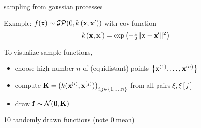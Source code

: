 \documentclass[11pt,compress,t,notes=noshow, xcolor=table]{beamer}
\begin{document}
\begin{framei}[sep=L]{sampling from gaussian processes}
\item Example: $\fx \sim \mathcal{GP}(\zero, \kxxp)$ with cov function
$$ \kxxp = \exp\left(-\tfrac{1}{2}\|\xv - \xv^\prime\|^2\right)$$
\item To visualize sample functions, 
\begin{itemize}
\item choose high number $n$ of (equidistant) points $\xdat$
  \item compute $\Kmat = \left(k(\xi, \xi[j]) \right)_{i,j \in \nset}$ from all pairs $\xi, \xi[j]$ 
  \item draw $\fv \sim \normal(\zero, \Kmat)$ 
\end{itemize}
\item 10 randomly drawn functions (note 0 mean)
\vfill
{}
\end{framei}

\endlecture
\end{document}
